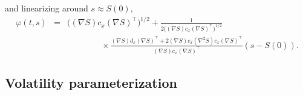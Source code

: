 \documentclass[12pt]{article}
\begin{document}
    and linearizing around $s\approx S(0)$,
    \begin{eqnarray}
      \varphi(t,s)&=&\bigg((\nabla S) c_x (\nabla S)^{\top}\bigg)^{1/2}
                      + \frac{1}{2\bigg((\nabla S) c_x (\nabla S)^{\top}\bigg)^{1/2}}\nonumber\\
          &&\quad\quad\quad\quad \times\frac{(\nabla S) d_x (\nabla S)^{\top} + 2(\nabla S) c_x (\nabla^2 S) c_x (\nabla S)^{\top}}
                                            {(\nabla S) c_x (\nabla S)^{\top}}\left(s-S(0)\right).
    \end{eqnarray}

  \subsection{Volatility parameterization}
\end{document}
